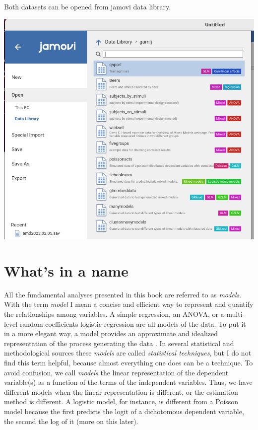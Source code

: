 \documentclass[
]{book}
\begin{document}
Both datasets can be opened from {jamovi} data library.

\includegraphics[width=0.9\linewidth]{bookletpics/0_datalibrary1}

\hypertarget{naming}{%
\section{What's in a name}\label{naming}}

All the fundamental analyses presented in this book are referred to as \emph{models}. With the term \emph{model} I mean a concise and efficient way to represent and quantify the relationships among variables. A simple regression, an ANOVA, or a multi-level random coefficients logistic regression are all models of the data. To put it in a more elegant way, a model provides an approximate and idealized representation of the process generating the data \citep{neyman1957inductive}. In several statistical and methodological sources these \emph{models} are called \emph{statistical techniques}, but I do not find this term helpful, because almost everything one does can be a technique. To avoid confusion, we call \emph{models} the linear representation of the dependent variable(s) as a function of the terms of the independent variables. Thus, we have different models when the linear representation is different, or the estimation method is different. A logistic model, for instance, is different from a Poisson model because the first predicts the logit of a dichotomous dependent variable, the second the log of it (more on this later).
\end{document}
